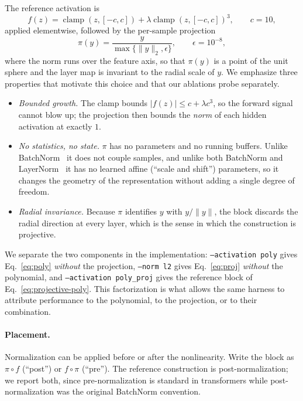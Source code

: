 The reference activation is
\begin{equation}
f(z) = \operatorname{clamp}(z, [-c, c]) + \lambda \operatorname{clamp}(z, [-c, c])^{3},
\qquad c = 10,
\label{eq:poly}
\end{equation}
applied elementwise, followed by the per-sample projection
\begin{equation}
\pi(y) = \frac{y}{\max\{\lVert y \rVert_2, \epsilon\}},
\qquad \epsilon = 10^{-8},
\label{eq:proj}
\end{equation}
where the norm runs over the feature axis, so that $\pi(y)$ is a point of the
unit sphere and the layer map is invariant to the radial scale of $y$. We
emphasize three properties that motivate this choice and that our ablations
probe separately.
\begin{itemize}
\item \emph{Bounded growth.} The clamp bounds $|f(z)| \le c + \lambda c^3$,
  so the forward signal cannot blow up; the projection then bounds the
  \emph{norm} of each hidden activation at exactly $1$.
\item \emph{No statistics, no state.} $\pi$ has no parameters and no running
  buffers. Unlike BatchNorm~\citep{ioffe2015batch} it does not couple samples,
  and unlike both
  BatchNorm and LayerNorm~\citep{ba2016layer} it has no learned affine
  (``scale and shift'')
  parameters, so it changes the geometry of the representation without adding
  a single degree of freedom.
\item \emph{Radial invariance.} Because $\pi$ identifies $y$ with $y/\lVert y
  \rVert$, the block discards the radial direction at every layer, which is
  the sense in which the construction is projective.
\end{itemize}

We separate the two components in the implementation: \texttt{--activation
poly} gives Eq.~\eqref{eq:poly} \emph{without} the projection, \texttt{--norm
l2} gives Eq.~\eqref{eq:proj} \emph{without} the polynomial, and \texttt{--activation
poly\_proj} gives the reference block of Eq.~\eqref{eq:projective-poly}. This
factorization is what allows the same harness to attribute performance to the
polynomial, to the projection, or to their combination.

\paragraph{Placement.} Normalization can be applied before or after the
nonlinearity. Write the block as $\pi \circ f$ (``post'') or $f \circ \pi$
(``pre''). The reference construction is post-normalization; we report both,
since pre-normalization is standard in transformers while post-normalization
was the original BatchNorm convention.

